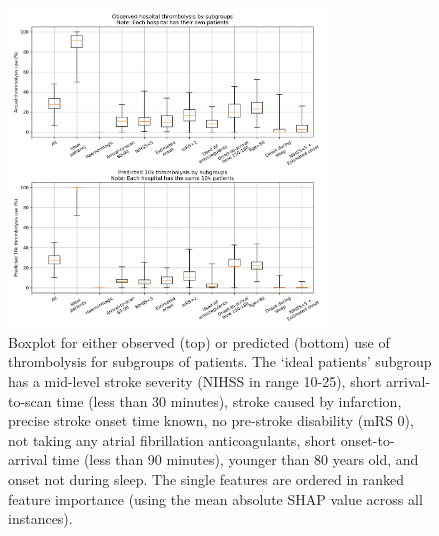 \begin{figure}[!h]
\centering
\includegraphics[width=0.75\textwidth]{./images/04c_xgb_10_features_10k_cohort_actual_vs_modelled_subgroup_boxplot}
\caption{Boxplot for either observed (top) or predicted (bottom) use of thrombolysis for subgroups of patients. The `ideal patients' subgroup has a mid-level stroke severity (NIHSS in range 10-25), short arrival-to-scan time (less than 30 minutes), stroke caused by infarction, precise stroke onset time known, no pre-stroke disability (mRS 0), not taking any atrial fibrillation anticoagulants, short onset-to-arrival time (less than 90 minutes), younger than 80 years old, and onset not during sleep. The single features are ordered in ranked feature importance (using the mean absolute SHAP value across all instances). }
\label{fig:results_boxplot}
\end{figure}